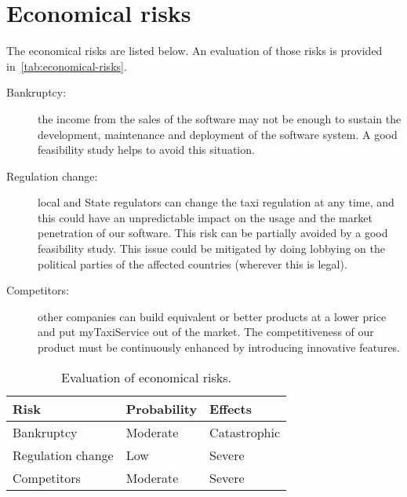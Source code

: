 \section{Economical risks}

The economical risks are listed below. An evaluation of those risks is provided in~\autoref{tab:economical-risks}.

\begin{description}
    \item[Bankruptcy:] the income from the sales of the software may not be enough to sustain the development, maintenance and deployment of the software system. A good feasibility study helps to avoid this situation.

    \item[Regulation change:] local and State regulators can change the taxi regulation at any time, and this could have an unpredictable impact on the usage and the market penetration of our software.
    This risk can be partially avoided by a good feasibility study. This issue could be mitigated by doing lobbying on the political parties of the affected countries (wherever this is legal).

    \item[Competitors:] other companies can build equivalent or better products at a lower price and put myTaxiService out of the market. The competitiveness of our product must be continuously enhanced by introducing innovative features.
\end{description}

\begin{table}[p]
\centering
    \begin{tabular}{| l | l | l |}
        \hline
        \textbf{Risk}       & \textbf{Probability}  & \textbf{Effects}  \\
        \hline
        Bankruptcy          & Moderate              & Catastrophic      \\
        \hline
        Regulation change   & Low                   & Severe            \\
        \hline
        Competitors         & Moderate              & Severe            \\
        \hline
    \end{tabular}
    \caption{Evaluation of economical risks.}
    \label{tab:economical-risks}
\end{table}
